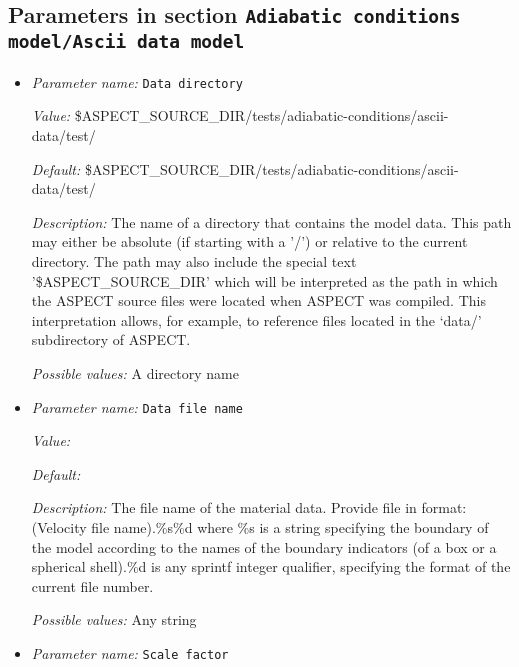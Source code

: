\subsection{Parameters in section \tt Adiabatic conditions model/Ascii data model}
\label{parameters:Adiabatic_20conditions_20model/Ascii_20data_20model}

\begin{itemize}
\item {\it Parameter name:} {\tt Data directory}
\label{parameters:Adiabatic conditions model/Ascii data model/Data directory}


{\it Value:} \$ASPECT\_SOURCE\_DIR/tests/adiabatic-conditions/ascii-data/test/


{\it Default:} \$ASPECT\_SOURCE\_DIR/tests/adiabatic-conditions/ascii-data/test/


{\it Description:} The name of a directory that contains the model data. This path may either be absolute (if starting with a '/') or relative to the current directory. The path may also include the special text '\$ASPECT\_SOURCE\_DIR' which will be interpreted as the path in which the ASPECT source files were located when ASPECT was compiled. This interpretation allows, for example, to reference files located in the `data/' subdirectory of ASPECT. 


{\it Possible values:} A directory name
\item {\it Parameter name:} {\tt Data file name}
\label{parameters:Adiabatic conditions model/Ascii data model/Data file name}


{\it Value:} 


{\it Default:} 


{\it Description:} The file name of the material data. Provide file in format: (Velocity file name).\%s\%d where \%s is a string specifying the boundary of the model according to the names of the boundary indicators (of a box or a spherical shell).\%d is any sprintf integer qualifier, specifying the format of the current file number. 


{\it Possible values:} Any string
\item {\it Parameter name:} {\tt Scale factor}
\label{parameters:Adiabatic conditions model/Ascii data model/Scale factor}



\end{itemize}
